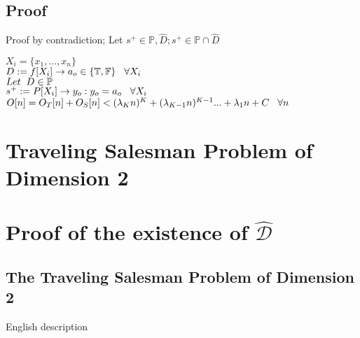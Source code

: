 \documentclass[11pt]{article}
\begin{document}
\subsection{Proof}
Proof by contradiction; Let $s^+ \in \mathbb{P}, \hat{D}; s^+ \in \mathbb{P} \cap \hat{D}$
\begin{center}
$
X_i = \{x_1,...,x_n\}
$
\\ \vspace{2mm}
$
D := f \lbrack X_i \rbrack \rightarrow a_{o} \in \{\mathbb{T}, \mathbb{F}\} \hspace{3mm} \forall X_i
$
\\ \vspace{6mm}
$
Let \hspace{2mm} D \in \mathbb{P}
$
\\ \vspace{2mm}
$
s^+ := P \lbrack X_i \rbrack \rightarrow y_{o} : y_o = a_{o} \hspace{3mm} \forall X_i
$
\\ \vspace{2mm}
$
O[n] = O_T[n] + O_S[n] < (\lambda_K n)^K + (\lambda_{K-1} n)^{K-1}... + \lambda_1 n + C \hspace{3mm} \forall n
$
\end{center}








\newpage
\section*{Traveling Salesman Problem of Dimension 2}
\section{Proof of the existence of $\hat{\mathcal{D}}$}

\subsection{The Traveling Salesman Problem of Dimension 2}
English description
\end{document}
